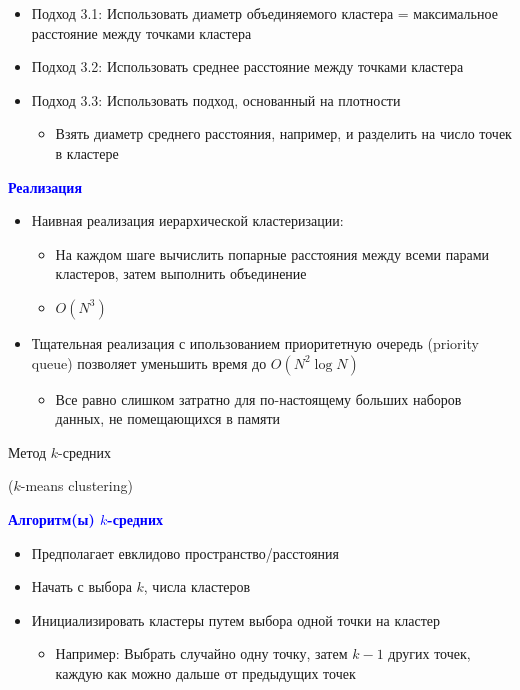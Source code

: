 \documentclass[landscape]{slides}
\begin{document}
\begin{normalsize}
\begin{slide}
\begin{itemize}
\item Подход 3.1: Использовать диаметр объединяемого кластера =
максимальное расстояние между точками кластера
\item Подход 3.2: Использовать среднее расстояние между точками кластера
\item Подход 3.3: Использовать подход, основанный на плотности
  \begin{itemize}
  \item Взять диаметр среднего расстояния, например, и разделить на число точек в кластере
  \end{itemize}
\end{itemize}
\end{slide}



\begin{slide}
\textbf{\textcolor{blue}{Реализация}}

\begin{itemize}
\item Наивная реализация иерархической кластеризации:
  \begin{itemize}
  \item На каждом шаге вычислить попарные расстояния между всеми парами кластеров, затем выполнить объединение
  \item $O(N^3)$
  \end{itemize}
\item Тщательная реализация с ипользованием приоритетную очередь (priority queue)
  позволяет уменьшить время до $O(N^2 \log N)$
  \begin{itemize}
  \item Все равно слишком затратно для по-настоящему больших наборов данных, не помещающихся в памяти
  \end{itemize}
\end{itemize}
\end{slide}


\begin{slide}
Метод $k$-средних

($k$-means clustering)
\end{slide}



\begin{slide}
\textbf{\textcolor{blue}{Алгоритм(ы) $k$-средних}}

\begin{itemize}
\item Предполагает евклидово пространство/расстояния
\item Начать с выбора $k$, числа кластеров
\item Инициализировать кластеры путем выбора одной точки на кластер
  \begin{itemize}
  \item Например: Выбрать случайно одну точку, затем $k-1$ других точек, каждую как можно дальше от предыдущих точек
  \end{itemize}
\end{itemize}
\end{slide}




\end{normalsize}
\end{document}
